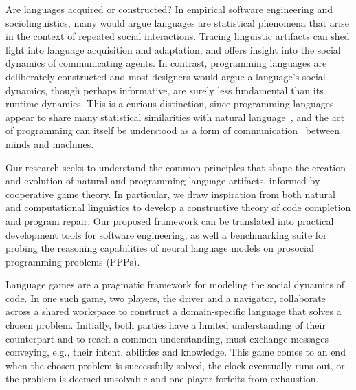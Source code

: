\documentclass[sigplan,screen]{acmart}
\begin{document}

Are languages acquired or constructed? In empirical software engineering and sociolinguistics, many would argue languages are statistical phenomena that arise in the context of repeated social interactions. Tracing linguistic artifacts can shed light into language acquisition and adaptation, and offers insight into the social dynamics of communicating agents. In contrast, programming languages are deliberately constructed and most designers would argue a language's social dynamics, though perhaps informative, are surely less fundamental than its runtime dynamics. This is a curious distinction, since programming languages appear to share many statistical similarities with natural language~\cite{hindle2016naturalness}, and the act of programming can itself be understood as a form of communication~\cite{demillo1979social} between minds and machines.

Our research seeks to understand the common principles that shape the creation and evolution of natural and programming language artifacts, informed by cooperative game theory. In particular, we draw inspiration from both natural and computational linguistics to develop a constructive theory of code completion and program repair. Our proposed framework can be translated into practical development tools for software engineering, as well a benchmarking suite for probing the reasoning capabilities of neural language models on prosocial programming problems (PPPs).

Language games are a pragmatic framework for modeling the social dynamics of code. In one such game, two players, the driver and a navigator, collaborate across a shared workspace to construct a domain-specific language that solves a chosen problem. Initially, both parties have a limited understanding of their counterpart and to reach a common understanding, must exchange messages conveying, e.g., their intent, abilities and knowledge. This game comes to an end when the chosen problem is successfully solved, the clock eventually runs out, or the problem is deemed unsolvable and one player forfeits from exhaustion.
\end{document}
